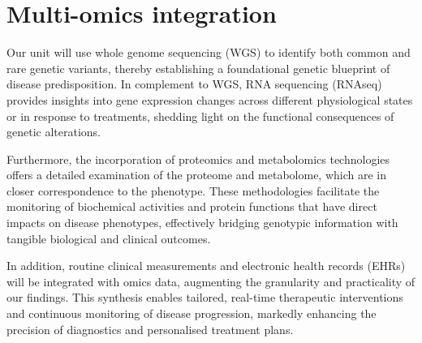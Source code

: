 
\section{Multi-omics integration}

Our unit will use whole genome sequencing (WGS) to identify both common and rare genetic variants, thereby establishing a foundational genetic blueprint of disease predisposition. In complement to WGS, RNA sequencing (RNAseq) provides insights into gene expression changes across different physiological states or in response to treatments, shedding light on the functional consequences of genetic alterations.

Furthermore, the incorporation of proteomics and metabolomics technologies offers a detailed examination of the proteome and metabolome, which are in closer correspondence to the phenotype. These methodologies facilitate the monitoring of biochemical activities and protein functions that have direct impacts on disease phenotypes, effectively bridging genotypic information with tangible biological and clinical outcomes.

In addition, routine clinical measurements and electronic health records (EHRs) will be integrated with omics data, augmenting the granularity and practicality of our findings. This synthesis enables tailored, real-time therapeutic interventions and continuous monitoring of disease progression, markedly enhancing the precision of diagnostics and personalised treatment plans.
